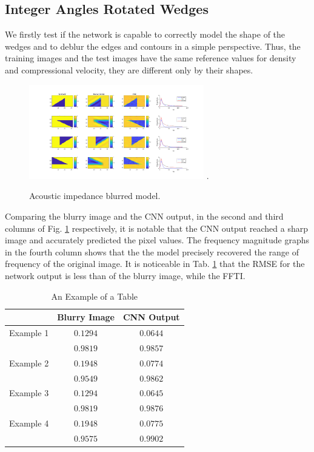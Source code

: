 \documentclass[conference,compsoc]{IEEEtran}
\begin{document}
\subsection{Integer Angles Rotated Wedges} \label{IARW}
We firstly test if the network is capable to correctly model the shape of the wedges
and to deblur the edges and contours in a simple perspective.
Thus, the training images and the test images have the same reference values for density and compressional velocity,
they are different only by their shapes.
\begin{figure}[!t]
\centering
\includegraphics[width=3.0in]{Figs/Caso1}
\DeclareGraphicsExtensions.
\caption{Acoustic impedance blurred model.}
\label{fig_scenario1}
\end{figure}
Comparing the blurry image and the CNN output,
in the second and third columns of Fig. \ref{fig_scenario1} respectively,
it is notable that the CNN output reached a sharp image and accurately
predicted the pixel values. The frequency magnitude graphs in the fourth
column shows that the the model precisely recovered the range of frequency
of the original image. It is noticeable in Tab. \ref{table_caso_1}
that the RMSE for the network output is less than of the blurry image,
while the FFTI.
\begin{table}[!t]
\renewcommand{\arraystretch}{1.3}
\caption{An Example of a Table}
\label{table_caso_1}
\centering
\begin{tabular}{|c||c||c|}
\hline
 & Blurry Image & CNN Output \\
\hline
Example 1 & $0.1294$ & $0.0644$\\
\hline
	  & $0.9819$ & $0.9857$\\
\hline
Example 2 & $0.1948$ & $0.0774$ \\
\hline
	  & $0.9549$ & $0.9862$\\
\hline
Example 3 & $0.1294$ & $0.0645$\\
\hline
	  & $0.9819$ & $0.9876$\\
\hline
Example 4 & $0.1948$ & $0.0775$\\
\hline
	  & $0.9575$ & $0.9902$\\
\hline
\end{tabular}
\end{table}
\end{document}
